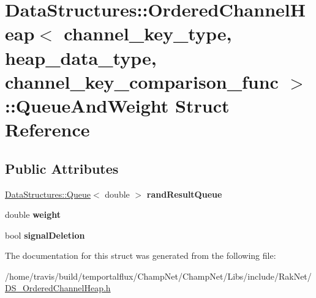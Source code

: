 \hypertarget{struct_data_structures_1_1_ordered_channel_heap_1_1_queue_and_weight}{\section{Data\-Structures\-:\-:Ordered\-Channel\-Heap$<$ channel\-\_\-key\-\_\-type, heap\-\_\-data\-\_\-type, channel\-\_\-key\-\_\-comparison\-\_\-func $>$\-:\-:Queue\-And\-Weight Struct Reference}
\label{struct_data_structures_1_1_ordered_channel_heap_1_1_queue_and_weight}
}
\subsection*{Public Attributes}
\begin{DoxyCompactItemize}
\item 
\hypertarget{struct_data_structures_1_1_ordered_channel_heap_1_1_queue_and_weight_aa2613a2d88d02022920c7e1e35acff14}{\hyperlink{class_data_structures_1_1_queue}{Data\-Structures\-::\-Queue}$<$ double $>$ {\bfseries rand\-Result\-Queue}}\label{struct_data_structures_1_1_ordered_channel_heap_1_1_queue_and_weight_aa2613a2d88d02022920c7e1e35acff14}

\item 
\hypertarget{struct_data_structures_1_1_ordered_channel_heap_1_1_queue_and_weight_a223f9fd06aea86618c8cc771e374d82d}{double {\bfseries weight}}\label{struct_data_structures_1_1_ordered_channel_heap_1_1_queue_and_weight_a223f9fd06aea86618c8cc771e374d82d}

\item 
\hypertarget{struct_data_structures_1_1_ordered_channel_heap_1_1_queue_and_weight_a2906f6b6bb0f53c33dfd1ce8a7c3d3ba}{bool {\bfseries signal\-Deletion}}\label{struct_data_structures_1_1_ordered_channel_heap_1_1_queue_and_weight_a2906f6b6bb0f53c33dfd1ce8a7c3d3ba}

\end{DoxyCompactItemize}


The documentation for this struct was generated from the following file\-:\begin{DoxyCompactItemize}
\item 
/home/travis/build/temportalflux/\-Champ\-Net/\-Champ\-Net/\-Libs/include/\-Rak\-Net/\hyperlink{_d_s___ordered_channel_heap_8h}{D\-S\-\_\-\-Ordered\-Channel\-Heap.\-h}\end{DoxyCompactItemize}
